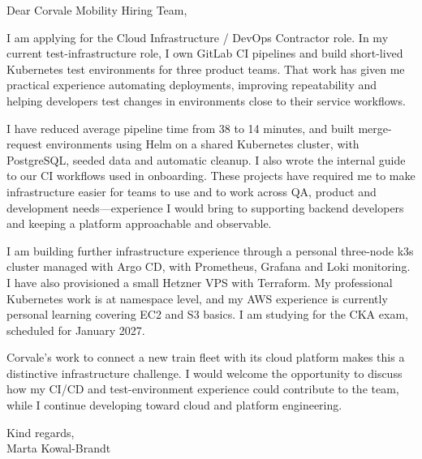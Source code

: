 \documentclass[11pt,a4paper]{article}
\begin{document}
Dear Corvale Mobility Hiring Team,

I am applying for the Cloud Infrastructure / DevOps Contractor role. In my current test-infrastructure role, I own GitLab CI pipelines and build short-lived Kubernetes test environments for three product teams. That work has given me practical experience automating deployments, improving repeatability and helping developers test changes in environments close to their service workflows.

I have reduced average pipeline time from 38 to 14 minutes, and built merge-request environments using Helm on a shared Kubernetes cluster, with PostgreSQL, seeded data and automatic cleanup. I also wrote the internal guide to our CI workflows used in onboarding. These projects have required me to make infrastructure easier for teams to use and to work across QA, product and development needs—experience I would bring to supporting backend developers and keeping a platform approachable and observable.

I am building further infrastructure experience through a personal three-node k3s cluster managed with Argo CD, with Prometheus, Grafana and Loki monitoring. I have also provisioned a small Hetzner VPS with Terraform. My professional Kubernetes work is at namespace level, and my AWS experience is currently personal learning covering EC2 and S3 basics. I am studying for the CKA exam, scheduled for January 2027.

Corvale's work to connect a new train fleet with its cloud platform makes this a distinctive infrastructure challenge. I would welcome the opportunity to discuss how my CI/CD and test-environment experience could contribute to the team, while I continue developing toward cloud and platform engineering.

Kind regards,\\
Marta Kowal-Brandt
\end{document}
